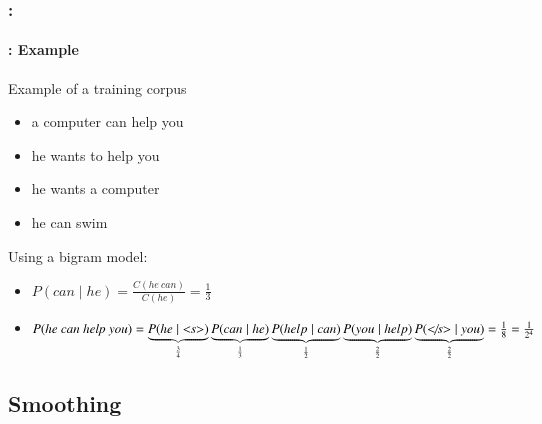 \documentclass[xcolor=table]{beamer}
\begin{document}
\begin{frame}
	\frametitle{\insertshortsubtitle: \insertsection}
	\framesubtitle{\insertsubsection: Example}

	\begin{exampleblock}{Example of a training corpus}
		\begin{itemize}
			\item a computer can help you
			\item he wants to help you
			\item he wants a computer
			\item he can swim
		\end{itemize}
	\end{exampleblock}
	
	Using a bigram model:
	\begin{itemize}
		\item $P(can \mid he) = \frac{C(he\ can)}{C(he)} = \frac{1}{3}$
		\item $P(\text{\textit{he can help you}}) = 
		\underbrace{P(he \mid \text{\textit{\textless s\textgreater}})}_{\frac{3}{4}}
		\underbrace{P(can \mid he)}_{\frac{1}{3}} 
		\underbrace{P(help \mid can)}_{\frac{1}{2}} 
		\underbrace{P(you \mid help)}_{\frac{2}{2}}
		\underbrace{P(\text{\textit{\textless/s\textgreater}} \mid you)}_{\frac{2}{2}} = 
		\frac{1}{8} = \frac{1}{2^4}
		$
	\end{itemize}

\end{frame}

\subsection{Smoothing}
\end{document}
